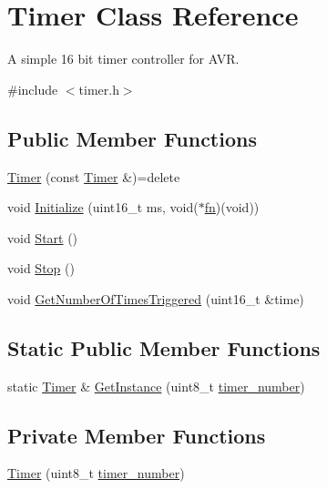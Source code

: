\hypertarget{class_timer}{}\section{Timer Class Reference}
\label{class_timer}


A simple 16 bit timer controller for A\+VR.  




{\ttfamily \#include $<$timer.\+h$>$}

\subsection*{Public Member Functions}
\begin{DoxyCompactItemize}
\item 
\hyperlink{class_timer_ae6b73141ad1d5029d3782d14d2fd5ff0}{Timer} (const \hyperlink{class_timer}{Timer} \&)=delete
\item 
void \hyperlink{class_timer_a04ed0eb1468656c271645c2165bbe147}{Initialize} (uint16\+\_\+t ms, void($\ast$\hyperlink{class_timer_af44fd5c977c119c25af6aeee6f7cdc7a}{fn})(void))
\item 
void \hyperlink{class_timer_a4e607b129b392c11adddd9641a320436}{Start} ()
\item 
void \hyperlink{class_timer_a6379e797f968aaee6ac3bb12dc6b81c5}{Stop} ()
\item 
void \hyperlink{class_timer_a4f536c9539a977acc3e262f8767694fa}{Get\+Number\+Of\+Times\+Triggered} (uint16\+\_\+t \&time)
\end{DoxyCompactItemize}
\subsection*{Static Public Member Functions}
\begin{DoxyCompactItemize}
\item 
static \hyperlink{class_timer}{Timer} \& \hyperlink{class_timer_a5a9960ef2a5394a76b4b024cae1a86a3}{Get\+Instance} (uint8\+\_\+t \hyperlink{class_timer_a3c813be60ee224a8d6b252a83dfe16d3}{timer\+\_\+number})
\end{DoxyCompactItemize}
\subsection*{Private Member Functions}
\begin{DoxyCompactItemize}
\item 
\hyperlink{class_timer_a609e586dbc0fdc159fc6fd490fcc1ae3}{Timer} (uint8\+\_\+t \hyperlink{class_timer_a3c813be60ee224a8d6b252a83dfe16d3}{timer\+\_\+number})
\end{DoxyCompactItemize}
